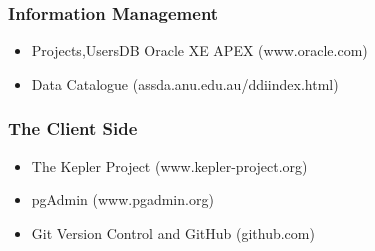 \documentclass[bigger]{beamer}
\begin{document}
\begin{frame}
\frametitle{Information Management}
\label{sec-2-5}

\begin{itemize}
\item Projects,UsersDB Oracle XE APEX (www.oracle.com)
\item Data Catalogue (assda.anu.edu.au/ddiindex.html)
\end{itemize}
\end{frame}
\begin{frame}
\frametitle{The Client Side}
\label{sec-2-6}

\begin{itemize}
\item The Kepler Project (www.kepler-project.org)
\item pgAdmin (www.pgadmin.org)
\item Git Version Control and GitHub (github.com)
\end{itemize}
\end{frame}
\end{document}
